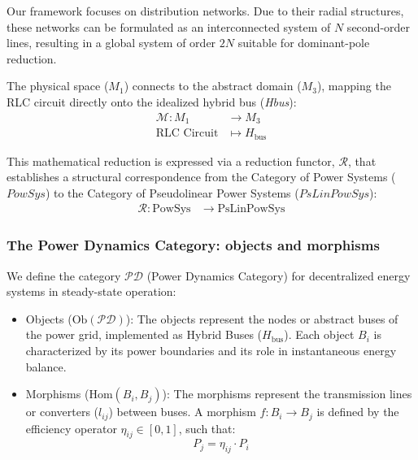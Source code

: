 \documentclass[energies,accept,oneauthor,pdftex]{Definitions/mdpi}
\begin{document}
Our framework focuses on distribution networks. Due to their radial structures, these networks can be formulated as an interconnected system of $N$ second-order lines, resulting in a global system of order $2N$ suitable for dominant-pole reduction.

The physical space ($M_1$) connects to the abstract domain ($M_3$), mapping the RLC circuit directly onto the idealized hybrid bus (\textit{Hbus}):
\begin{equation*}
\begin{aligned}
\mathcal{M} : M_1 &\to M_3 \\
\text{RLC Circuit} &\mapsto H_{\text{bus}}
\end{aligned}
\end{equation*}

This mathematical reduction is expressed via a reduction functor, $\mathcal{R}$, that establishes a structural correspondence from the Category of Power Systems (${PowSys}$) to the Category of Pseudolinear Power Systems ($PsLinPowSys$):
\begin{equation*}
\begin{aligned}
\mathcal{R} : \mathrm{PowSys} &\to \mathrm{PsLinPowSys}
\end{aligned}
\end{equation*}



\subsubsection*{The Power Dynamics Category: objects and morphisms}
We define the category $\mathcal{PD}$ (Power Dynamics Category) for decentralized energy systems in steady-state operation:
\begin{itemize}
    \item {Objects ($\mathrm{Ob}(\mathcal{PD})$):} The objects represent the nodes or abstract buses of the power grid, implemented as Hybrid Buses ($H_{\text{bus}}$). Each object $B_i$ is characterized by its power boundaries and its role in instantaneous energy balance.
    \item {Morphisms ($\mathrm{Hom}(B_i, B_j)$):} The morphisms represent the transmission lines or converters ($l_{ij}$) between buses. A morphism $f: B_i \to B_j$ is defined by the efficiency operator $\eta_{ij} \in [0, 1]$, such that:
    \begin{equation}
        P_j = \eta_{ij} \cdot P_i
    \end{equation}
\end{itemize}
\end{document}
